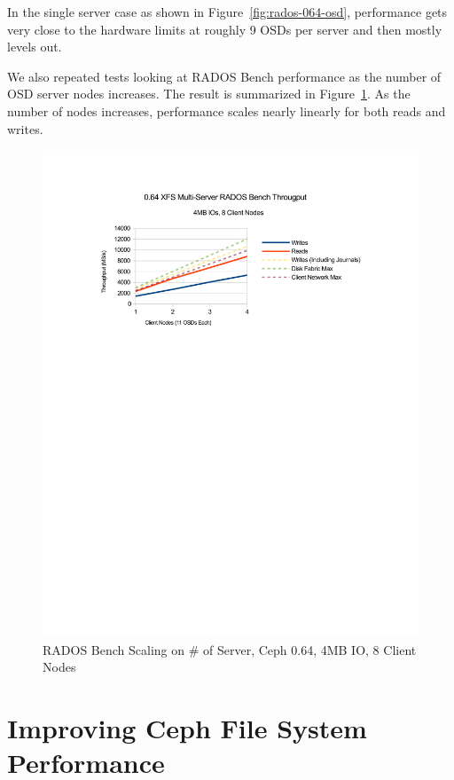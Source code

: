 \documentclass{article}
\begin{document}
In the single server case as shown in Figure~\ref{fig:rados-064-osd},
performance gets very close to the hardware limits at roughly 9 OSDs per server
and then mostly levels out.

We also repeated tests looking at RADOS Bench performance as the
number of OSD server nodes increases. The result is summarized in
Figure~\ref{fig:rados-064-oss}. As the number of nodes increases, performance
scales nearly linearly for both reads and writes.


\begin{figure}[htb]
\centering
\includegraphics[width=5in]{rados-064-oss}
\caption{RADOS Bench Scaling on \# of Server, Ceph 0.64, 4MB IO, 8 Client Nodes}
\label{fig:rados-064-oss}
\end{figure}



\section{Improving Ceph File System Performance}
\end{document}
